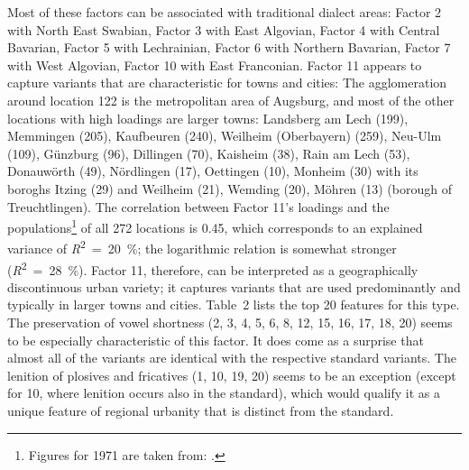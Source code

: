 \documentclass[output=paper]{LSP/langsci}
\begin{document}
Most of these factors can be associated with traditional dialect areas: Factor 2 with North East Swabian, Factor 3 with East Algovian, Factor 4 with Central Bavarian, Factor 5 with Lechrainian, Factor 6 with Northern Bavarian, Factor 7 with West Algovian, Factor 10 with East Franconian. Factor 11 appears to capture variants that are characteristic for towns and cities: The agglomeration around location 122 is the metropolitan area of Augsburg, and most of the other locations with high loadings are larger towns: Landsberg am Lech (199), Memmingen (205), Kaufbeuren (240), Weilheim (Oberbayern) (259), Neu-Ulm (109), Günzburg (96), Dillingen (70), Kaisheim (38), Rain am Lech (53), Donauwörth (49), Nördlingen (17), Oettingen (10), Monheim (30) with its boroghs Itzing (29) and Weilheim (21), Wemding (20), Möhren (13) (borough of Treuchtlingen). The correlation between Factor 11’s loadings and the populations\footnote{Figures for 1971 are taken from: \citet{bayerisches_statistisches_landesamt_einwohnerzahlen_1972}.} of all 272 locations is 0.45, which corresponds to an explained variance of \textit{R}\textsuperscript{2}~=~20~\%; the logarithmic relation is somewhat stronger (\textit{R}\textsuperscript{2}~=~28~\%). Factor 11, therefore, can be interpreted as a geographically discontinuous urban variety; it captures variants that are used predominantly and typically in larger towns and cities. Table~2 lists the top 20 features for this type. The preservation of vowel shortness (2, 3, 4, 5, 6, 8, 12, 15, 16, 17, 18, 20) seems to be especially characteristic of this factor. It does come as a surprise that almost all of the variants are identical with the respective standard variants. The lenition of plosives and fricatives (1, 10, 19, 20) seems to be an exception (except for 10, where lenition occurs also in the standard), which would qualify it as a unique feature of regional urbanity that is distinct from the standard.
\end{document}
